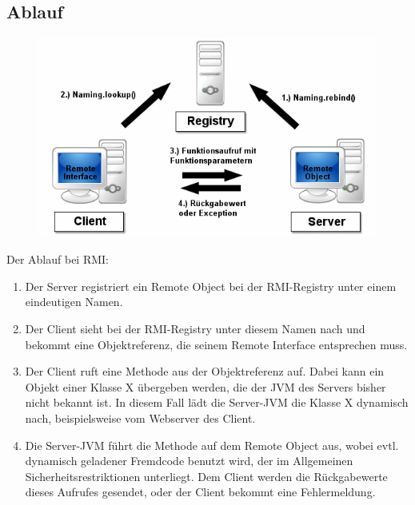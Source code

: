 \documentclass[10pt]{article}
\begin{document}
\subsection{Ablauf}
\begin{figure}
	\centering
	\includegraphics[scale=0.35]{rmi-schema.png}%
\end{figure}
Der Ablauf bei RMI:
\begin{enumerate}
	\item Der Server registriert ein Remote Object bei der RMI-Registry unter einem eindeutigen Namen.
	\item Der Client sieht bei der RMI-Registry unter diesem Namen nach und bekommt eine Objektreferenz, die seinem Remote Interface entsprechen muss.
	\item Der Client ruft eine Methode aus der Objektreferenz auf. Dabei kann ein Objekt einer Klasse X übergeben werden, die der JVM des Servers bisher nicht bekannt ist. In diesem Fall lädt die Server-JVM die Klasse X dynamisch nach, beispielsweise vom Webserver des Client.
	\item Die Server-JVM führt die Methode auf dem Remote Object aus, wobei evtl. dynamisch geladener Fremdcode benutzt wird, der im Allgemeinen Sicherheitsrestriktionen unterliegt. Dem Client werden die Rückgabewerte dieses Aufrufes gesendet, oder der Client bekommt eine Fehlermeldung.
\end{enumerate}
\end{document}
